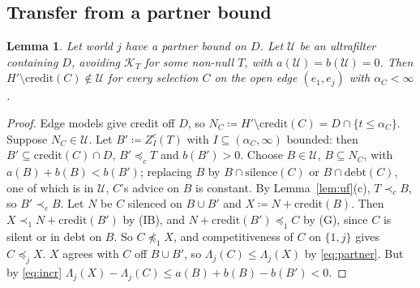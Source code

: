 \documentclass[11pt]{article}
\newtheorem{lemma}[theorem]{Lemma}
\theoremstyle{definition}\newtheorem{definition}[theorem]{Definition}
\theoremstyle{remark}\newtheorem{remark}[theorem]{Remark}
\newcommand{\debt}{\mathrm{debt}}
\newcommand{\cred}{\mathrm{credit}}
\newcommand{\sil}{\mathrm{silence}}
\newcommand{\Kid}{\mathcal K}
\newcommand{\Uf}{\mathcal U}
\begin{document}
\subsection{Transfer from a partner bound}

\begin{lemma}\label{lem:creditconf}
Let world $j$ have a partner bound on $D$. Let $\Uf$ be an ultrafilter
containing $D$, avoiding $\Kid_T$ for some non-null $T$, with
$a(\Uf)=b(\Uf)=0$. Then $H'\setminus\cred(C)\notin\Uf$ for every selection
$C$ on the open edge $(e_1,e_j)$ with $\alpha_C<\infty$.
\end{lemma}
\begin{proof}
Edge models give credit off $D$, so $N_C\coloneqq H'\setminus\cred(C)
=D\cap\{t\le\alpha_C\}$. Suppose $N_C\in\Uf$. Let
$B'\coloneqq Z^c_I(T)$ with $I\subseteq(\alpha_C,\infty)$ bounded: then
$B'\subseteq\cred(C)\cap D$, $B'\preceq_cT$ and $b(B')>0$. Choose
$B\in\Uf$, $B\subseteq N_C$, with $a(B)+b(B)<b(B')$; replacing $B$ by
$B\cap\sil(C)$ or $B\cap\debt(C)$, one of which is in $\Uf$, $C$'s advice on
$B$ is constant. By Lemma~\ref{lem:uf}(c), $T\prec_cB$, so $B'\prec_cB$. Let
$N$ be $C$ silenced on $B\cup B'$ and $X\coloneqq N+\cred(B)$. Then
$X\prec_1N+\cred(B')$ by (IB), and $N+\cred(B')\preceq_1C$ by (G), since $C$
is silent or in debt on $B$. So $C\not\preceq_1X$, and competitiveness of $C$
on $\{1,j\}$ gives $C\preceq_jX$. $X$ agrees with $C$ off $B\cup B'$, so
$\Lambda_j(C)\le\Lambda_j(X)$ by \eqref{eq:partner}. But by \eqref{eq:incr}
$\Lambda_j(X)-\Lambda_j(C)\le a(B)+b(B)-b(B')<0$.
\end{proof}
\end{document}
